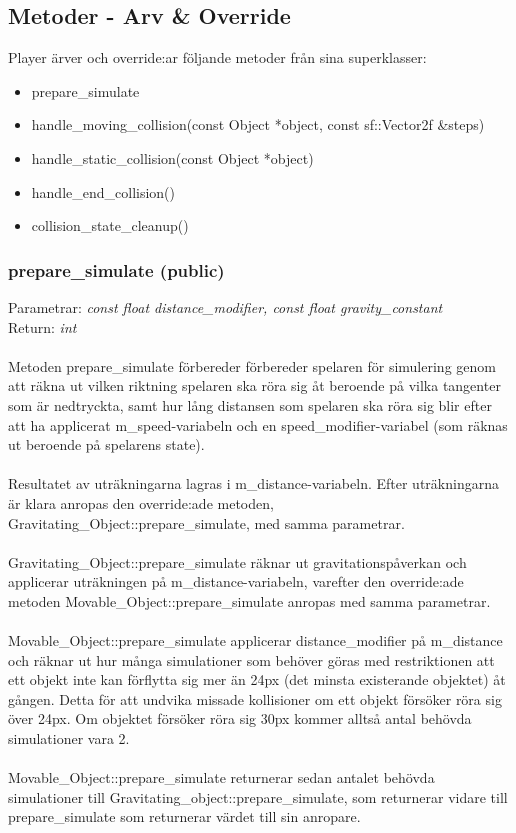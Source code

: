 \documentclass{TDP003mall}
\begin{document}
\subsection{Metoder - Arv \& Override}
Player ärver och override:ar följande metoder från sina superklasser:
\begin{itemize}
\item prepare\_simulate
\item handle\_moving\_collision(const Object *object, const sf::Vector2f \&steps)
\item handle\_static\_collision(const Object *object)
\item handle\_end\_collision()
\item collision\_state\_cleanup()
\end{itemize}

 \subsubsection{prepare\_simulate (public)}
Parametrar: \textit{const float distance\_modifier, const float gravity\_constant}
\\Return: \textit{int}
\\\\
Metoden prepare\_simulate förbereder förbereder spelaren för simulering genom att räkna ut vilken riktning spelaren ska röra sig åt beroende på vilka tangenter som är nedtryckta, samt hur lång distansen som spelaren ska röra sig blir efter att ha applicerat m\_speed-variabeln och en speed\_modifier-variabel (som räknas ut beroende på spelarens state).
\\\\
Resultatet av uträkningarna lagras i m\_distance-variabeln. Efter uträkningarna är klara anropas den override:ade metoden, Gravitating\_Object::prepare\_simulate, med samma parametrar.
\\\\
Gravitating\_Object::prepare\_simulate räknar ut gravitationspåverkan och applicerar uträkningen på m\_distance-variabeln, varefter den override:ade metoden Movable\_Object::prepare\_simulate anropas med samma parametrar.
\\\\
Movable\_Object::prepare\_simulate applicerar distance\_modifier på m\_distance och räknar ut hur många simulationer som behöver göras med restriktionen att ett objekt inte kan förflytta sig mer än 24px (det minsta existerande objektet) åt gången. Detta för att undvika missade kollisioner om ett objekt försöker röra sig över 24px. Om objektet försöker röra sig 30px kommer alltså antal behövda simulationer vara 2.
\\\\
Movable\_Object::prepare\_simulate returnerar sedan antalet behövda simulationer till Gravitating\_object::prepare\_simulate, som returnerar vidare till prepare\_simulate som returnerar värdet till sin anropare.
\\\\
\end{document}

